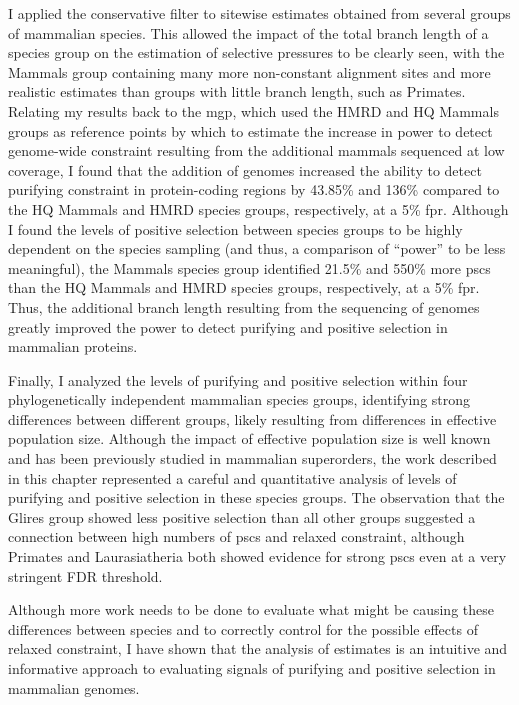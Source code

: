I applied the conservative filter to sitewise estimates obtained from
several groups of mammalian species. This allowed the impact of the
total branch length of a species group on the estimation of \sw
selective pressures to be clearly seen, with the Mammals group
containing many more non-constant alignment sites and more realistic
\omgml estimates than groups with little branch length, such as
Primates. Relating my results back to the \ac{mgp}, which used the
HMRD and HQ Mammals groups as reference points by which to estimate
the increase in power to detect genome-wide constraint resulting from
the additional mammals sequenced at low coverage, I found that the
addition of \lcv genomes increased the ability to detect purifying
constraint in protein-coding regions by 43.85\% and 136\% compared to
the HQ Mammals and HMRD species groups, respectively, at a 5\%
\ac{fpr}. Although I found the levels of positive selection between
species groups to be highly dependent on the species sampling (and
thus, a comparison of ``power'' to be less meaningful), the Mammals
species group identified 21.5\% and 550\% more \acp{psc} than the HQ
Mammals and HMRD species groups, respectively, at a 5\%
\ac{fpr}. Thus, the additional branch length resulting from the
sequencing of \lcv genomes greatly improved the power to detect
purifying and positive selection in mammalian proteins.

Finally, I analyzed the levels of purifying and positive selection
within four phylogenetically independent mammalian species groups,
identifying strong differences between different groups, likely
resulting from differences in effective population size. Although the
impact of effective population size is well known and has been
previously studied in mammalian superorders, the work described in
this chapter represented a careful and quantitative analysis of levels
of purifying and positive selection in these species groups. The
observation that the Glires group showed less positive selection than
all other groups suggested a connection between high numbers of
\acp{psc} and relaxed constraint, although Primates and Laurasiatheria
both showed evidence for strong \acp{psc} even at a very stringent FDR
threshold.

Although more work needs to be done to evaluate what might be causing
these differences between species and to correctly control for the
possible effects of relaxed constraint, I have shown that the analysis
of \sw estimates is an intuitive and informative approach to
evaluating signals of purifying and positive selection in mammalian
genomes.

